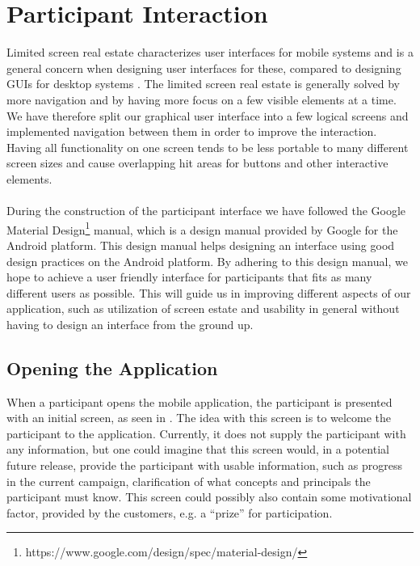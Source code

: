 
\section{Participant Interaction}
\label{sec:participant_interaction}
Limited screen real estate characterizes user interfaces for mobile systems and is a general concern when designing user interfaces for these, compared to designing GUIs for desktop systems \parencite[cha. 21]{mobile_computing_constraints}. The limited screen real estate is generally solved by more navigation and by having more focus on a few visible elements at a time. We have therefore split our graphical user interface into a few logical screens and implemented navigation between them in order to improve the interaction. Having all functionality on one screen tends to be less portable to many different screen sizes and cause overlapping hit areas for buttons and other interactive elements.
\\\\
During the construction of the participant interface we have followed the Google Material Design\footnote{https://www.google.com/design/spec/material-design/} manual, which is a design manual provided by Google for the Android platform. This design manual helps designing an interface using good design practices on the Android platform. By adhering to this design manual, we hope to achieve a user friendly interface for participants that fits as many different users as possible. This will guide us in improving different aspects of our application, such as utilization of screen estate and usability in general without having to design an interface from the ground up.

\subsection{Opening the Application}
\label{sub:opening_the_application}
When a participant opens the mobile application, the participant is presented with an initial screen, as seen in . The idea with this screen is to welcome the participant to the application. Currently, it does not supply the participant with any information, but one could imagine that this screen would, in a potential future release, provide the participant with usable information, such as progress in the current campaign, clarification of what concepts and principals the participant must know. This screen could possibly also contain some motivational factor, provided by the customers, e.g. a ``prize'' for participation.


